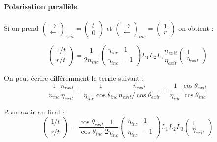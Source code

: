 \documentclass[a4paper,english]{article}
\begin{document}
\paragraph{Polarisation parallèle}
Si on prend $\begin{pmatrix}\rightarrow \\ \leftarrow\end{pmatrix}_{exit} = \begin{pmatrix}t \\ 0\end{pmatrix}$ et $\begin{pmatrix}\rightarrow \\ \leftarrow\end{pmatrix}_{inc} = \begin{pmatrix}1 \\ r\end{pmatrix}$ on obtient :

\begin{dmath}
\begin{pmatrix}1/t \\ r/t \end{pmatrix} = \frac{1}{2 n_{inc}} \begin{pmatrix} \eta_{inc} & 1 \\ \eta_{inc} & -1 \end{pmatrix} L_1 L_2 L_3 \frac{n_{exit}}{\eta_{exit}} \begin{pmatrix} 1 \\ \eta_{exit} \end{pmatrix}
\end{dmath}

On peut écrire différemment le terme suivant :
\begin{dmath}
\frac{1}{n_{inc}} \frac{n_{exit}}{\eta_{exit}} = \frac{1}{\eta_{inc} \cos \theta_{inc}} \frac{n_{exit}}{n_{exit} / \cos \theta_{exit}}
= \frac{1}{\eta_{inc}} \frac{\cos \theta_{exit}}{\cos \theta_{inc}}
\end{dmath}

Pour avoir au final :
\begin{dmath}
\begin{pmatrix}1/t \\ r/t \end{pmatrix} = \frac{\cos \theta_{exit}}{\cos \theta_{inc}} \frac{1}{2 \eta_{inc}} \begin{pmatrix} \eta_{inc} & 1 \\ \eta_{inc} & -1 \end{pmatrix} L_1 L_2 L_3 \begin{pmatrix} 1 \\ \eta_{exit} \end{pmatrix}
\end{dmath}
\end{document}
